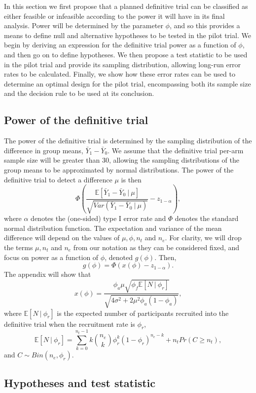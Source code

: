 \documentclass[AMA,STIX1COL]{WileyNJD-v2}
\begin{document}
In this section we first propose that a planned definitive trial can be classified as either feasible or infeasible according to the power it will have in its final analysis. Power will be determined by the parameter $\phi$, and so this provides a means to define null and alternative hypotheses to be tested in the pilot trial. We begin by deriving an expression for the definitive trial power as a function of $\phi$, and then go on to define hypotheses. We then propose a test statistic to be used in the pilot trial and provide its sampling distribution, allowing long-run error rates to be calculated. Finally, we show how these error rates can be used to determine an optimal design for the pilot trial, encompassing both its sample size and the decision rule to be used at its conclusion.

\subsection{Power of the definitive trial}\label{sec:power}

The power of the definitive trial is determined by the sampling distribution of the difference in group means, $\bar{Y}_1 - \bar{Y}_0$. We assume that the definitive trial per-arm sample size will be greater than 30, allowing the sampling distributions of the group means to be approximated by normal distributions. The power of the definitive trial to detect a difference $\mu$ is then
$$
\Phi \left(\frac{\mathbb{E}[\bar{Y}_1 - \bar{Y}_0 ~|~ \mu]}{\sqrt{Var(\bar{Y}_1 - \bar{Y}_0 ~|~ \mu)}} - z_{1-\alpha} \right),
$$
where $\alpha$ denotes the (one-sided) type I error rate and $\Phi$ denotes the standard normal distribution function. The expectation and variance of the mean difference will depend on the values of $\mu, \phi, n_t$ and $n_e$. For clarity, we will drop the terms $\mu, n_t$ and $n_e$ from our notation as they can be considered fixed, and focus on power as a function of $\phi$, denoted $g(\phi)$. Then,
$$
g(\phi) = \Phi \left( x(\phi) - z_{1-\alpha} \right).
$$
The appendix will show that
$$
x(\phi) =  \frac{ \phi_a\mu \sqrt{\phi_f \mathbb{E}[N ~|~ \phi_r]} } {\sqrt{4\sigma^2 + 2 \mu^2 \phi_a(1-\phi_a)}},
$$
where $\mathbb{E}[N ~|~ \phi_r]$ is the expected number of participants recruited into the definitive trial when the recruitment rate is $\phi_r$,
$$
\mathbb{E}[N ~|~ \phi_r] = \sum_{k=0}^{n_t-1} k{n_e \choose k} \phi_r^k (1-\phi_r)^{n_e - k} + n_t Pr(C \geq n_t),
$$
and $C \sim Bin(n_e, \phi_r)$.

\subsection{Hypotheses and test statistic}
\end{document}
